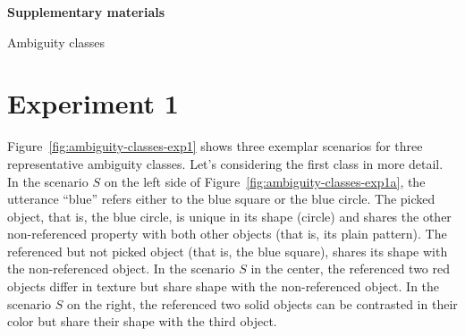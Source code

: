 \documentclass[10pt,a4paper]{article}
\date{}
\begin{document}
\begin{minipage}{.99\linewidth}
\centering
\large{

\textbf{Supplementary materials} 

Ambiguity classes}
\end{minipage}

\section*{Experiment 1}

Figure~\ref{fig:ambiguity-classes-exp1} shows three exemplar scenarios for three representative ambiguity classes. 
Let's considering the first class in more detail.
In the scenario $S$ on the left side of Figure~\ref{fig:ambiguity-classes-exp1a}, 
the utterance ``blue'' refers either to the blue square or the blue circle.
The picked object, that is, the blue circle, is unique in its shape (circle) and shares the other non-referenced property with both other objects (that is, its plain pattern). 
The referenced but not picked object (that is, the blue square), shares its shape with the non-referenced object. 
In the scenario $S$ in the center, the referenced two red objects differ in texture but share shape with the non-referenced object.
In the scenario $S$ on the right, the referenced two solid objects can be contrasted in their color but share their shape with the third object.
\end{document}
